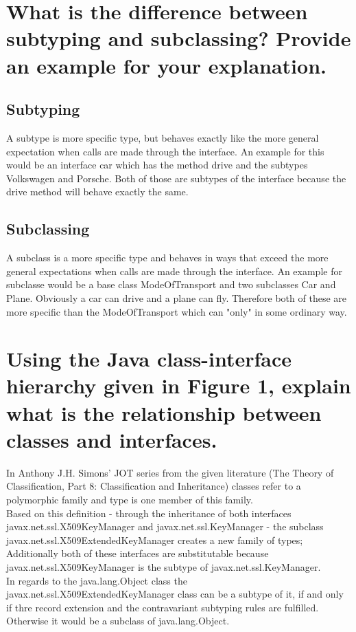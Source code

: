 \documentclass{report}
\begin{document}
	\section{What is the difference between subtyping and subclassing? Provide an example for your explanation.}
	\startsection
		\subsection{Subtyping}
		\startsubsection
			A subtype is more specific type, but behaves exactly like the more general expectation when calls are made through the interface. An example for this would be an interface car which has the method drive and the subtypes Volkswagen and Porsche. Both of those are subtypes of the interface because the drive method will behave exactly the same.
		\closesection
		\subsection{Subclassing}
		\startsubsection
			A subclass is a more specific type and behaves in ways that exceed the more general expectations when calls are made through the interface. An example for subclasse would be a base class ModeOfTransport and two subclasses Car and Plane. Obviously a car can drive and a plane can fly. Therefore both of these are more specific than the ModeOfTransport which can "only" in some ordinary way.
		\closesection
	\closesection
	
	\section{Using the Java class-interface hierarchy given in Figure 1, explain what is the relationship between classes and interfaces.}
	\startsection
		In Anthony J.H. Simons’ JOT series from the given literature (The Theory of Classification, Part 8: Classification and Inheritance) classes refer to a polymorphic family and type is one member of this family. \\
		Based on this definition - through the inheritance of both interfaces javax.net.ssl.X509KeyManager and javax.net.ssl.KeyManager - the subclass javax.net.ssl.X509ExtendedKeyManager creates a new family of types; Additionally both of these interfaces are substitutable because javax.net.ssl.X509KeyManager is the subtype of javax.net.ssl.KeyManager. \\
		In regards to the java.lang.Object class the javax.net.ssl.X509ExtendedKeyManager class can be a subtype of it, if and only if thre record extension and the contravariant subtyping rules are fulfilled. Otherwise it would be a subclass of java.lang.Object.
	\closesection
	
\end{document}
